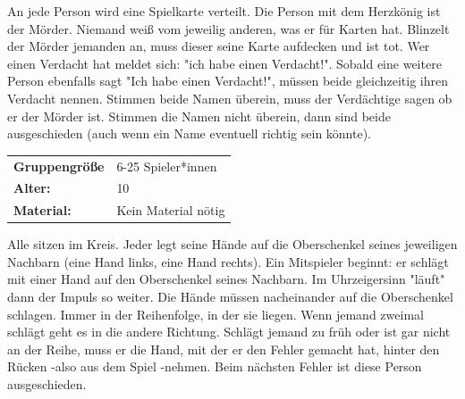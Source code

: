 An jede Person wird eine Spielkarte verteilt. Die Person mit dem Herzkönig ist der Mörder. Niemand weiß vom jeweilig anderen, was er für Karten hat. Blinzelt der Mörder jemanden an, muss dieser seine Karte aufdecken und ist tot. Wer einen Verdacht hat meldet sich: "ich habe einen Verdacht!". Sobald eine weitere Person ebenfalls sagt "Ich habe einen Verdacht!", müssen beide gleichzeitig ihren Verdacht nennen. Stimmen beide Namen überein, muss der Verdächtige sagen ob er der Mörder ist. Stimmen die Namen nicht überein, dann sind beide ausgeschieden (auch wenn ein Name eventuell richtig sein könnte). \\



\begin{table}[H]
\begin{tabular}{>{\bfseries}lp{8cm}}
   Gruppengröße   & 6-25 Spieler*innen\\
    Alter: & 10 \\
    Material: & Kein Material nötig\\
\end{tabular}
\end{table} 
Alle sitzen im Kreis. Jeder legt seine Hände auf die Oberschenkel seines jeweiligen Nachbarn (eine Hand links, eine Hand rechts). Ein Mitspieler beginnt: er schlägt mit einer Hand auf den Oberschenkel seines Nachbarn. Im Uhrzeigersinn "läuft" dann der Impuls so weiter. Die Hände müssen nacheinander auf die Oberschenkel schlagen. Immer in der Reihenfolge, in der sie liegen. Wenn jemand zweimal schlägt geht es in die andere Richtung. Schlägt jemand zu früh oder ist gar nicht an der Reihe, muss er die Hand, mit der er den Fehler gemacht hat, hinter den Rücken -also aus dem Spiel -nehmen. Beim nächsten Fehler ist diese Person ausgeschieden. \\



